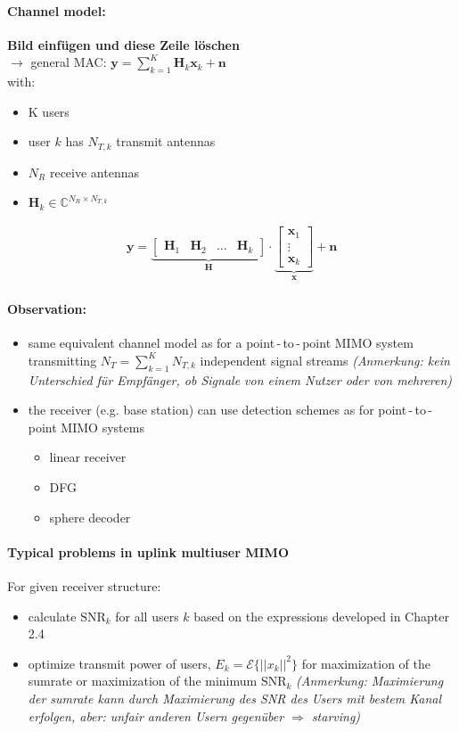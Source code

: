 \documentclass[a4paper, 10pt]{article}
\begin{document}
\paragraph*{Channel model:}
\textbf{Bild einf\"ugen und diese Zeile l\"oschen}\\
$\rightarrow  $ general MAC: $\mathbf{y} = \sum\limits_{k = 1}^{K}\mathbf{H}_k\mathbf{x}_k + \mathbf{n} $\\
with: \begin{itemize}
	\item K users
	\item user $k $ has $N_{T,k} $ transmit antennas
	\item $N_R $ receive antennas
	\item $\mathbf{H}_k \in \mathbb{C}^{N_R\times N_{T,k}} $ 
\end{itemize}
\begin{align*}
	\mathbf{y} = 
	\underbrace{
	\begin{bmatrix}\mathbf{H}_1 & \mathbf{H}_2 & \ldots & \mathbf{H}_k 	
	\end{bmatrix}
	}_{\mathbf{H}}\cdot
	\underbrace{
	\begin{bmatrix}\mathbf{x}_1 \\ \vdots \\ \mathbf{x}_k		
	\end{bmatrix}}_{\mathbf{x}} + \mathbf{n}
\end{align*}
\paragraph*{Observation:}
\begin{itemize}
	\item same equivalent channel model as for a point\,-\,to\,-\,point MIMO system transmitting $N_T = \sum_{k = 1}^{K} N_{T,k} $ independent signal streams \quad \textit{(Anmerkung: kein Unterschied f\"ur Empf\"anger, ob Signale von einem Nutzer oder von mehreren)}
	\item the receiver (e.g. base station) can use detection schemes as for point\,-\,to\,-\,point MIMO systems
	\begin{itemize}
		\item linear receiver
		\item DFG
		\item sphere decoder
	\end{itemize}
\end{itemize}
\paragraph*{Typical problems in uplink multiuser MIMO}
For given receiver structure:
\begin{itemize}
	\item calculate $\text{SNR}_k $ for all users $k $ based on the expressions developed in Chapter 2.4
	\item optimize transmit power of users, $E_k = \mathcal{E}\bigl\{||x_k||^2\bigr\} $ for maximization of the sumrate or maximization of the minimum $\text{SNR}_k $ \quad \textit{(Anmerkung: Maximierung der \textit{sumrate} kann durch Maximierung des SNR des Users mit bestem Kanal erfolgen, aber: unfair anderen Usern gegen\"uber $\Rightarrow $ \textit{starving})}
\end{itemize}
\end{document}
